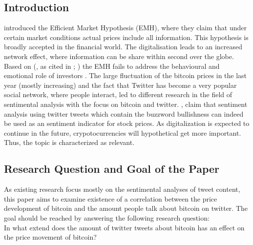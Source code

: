 \documentclass[a4paper,american,12pt]{article}
\begin{document}
\begin{spacing}{1.2}
\cleardoublepage{}
\section{Introduction}
\label{sec:intro}
\textcite[p.~388]{malkiel1970efficient} introduced the Efficient Market Hypothesis (EMH), where they claim that under certain market conditions actual prices include all information. This hypothesis is broadly accepted in the financial world. The digitalisation leads to an increased network effect, where information can be share within second over the globe. Based on \citeauthor{mao2015quantifying} (\citeyear[][p.~3]{mao2015quantifying}, as cited in \cite[][pp.~175--195]{shiller2015irrational}; \cite[][pp.~279]{kahneman2013prospect}) the EMH fails to address the behavioural and emotional role of investors . The large fluctuation of the bitcoin prices in the last year (mostly increasing) and the fact that Twitter has become a very popular social network, where people interact, led to different research in the field of sentimental analysis with the focus on bitcoin and twitter. \textcite[p.~18]{mao2015quantifying}, claim that sentiment analysis using twitter tweets which contain the buzzword bullishness can indeed be used as an sentiment indicator for stock prices. As digitalization is expected to continue in the future, crypotocurrencies will hypothetical get more important. Thus, the topic is characterized as relevant.

\subsection{Research Question and Goal of the Paper}
\label{sec:ResearchQandGoal}
As existing research focus mostly on the sentimental analyses of tweet content, this paper aims to examine existence of a correlation between the price development of bitcoin and the amount people talk about bitcoin on twitter. The goal should be reached by answering the following research question: \\
In what extend does the amount of twitter tweets about bitcoin has an effect on the price movement of bitcoin?


\end{spacing}
\end{document}
